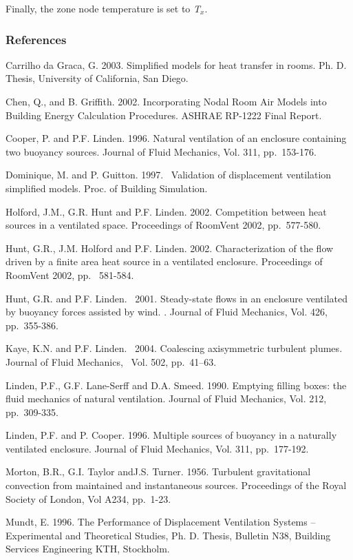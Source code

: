 Finally, the zone node temperature is set to \emph{T\(_{x}\)}.

\subsubsection{References}\label{references-2-000}

Carrilho da Graca, G. 2003. Simplified models for heat transfer in rooms. Ph. D. Thesis, University of California, San Diego.

Chen, Q., and B. Griffith. 2002. Incorporating Nodal Room Air Models into Building Energy Calculation Procedures. ASHRAE RP-1222 Final Report.

Cooper, P. and P.F. Linden. 1996. Natural ventilation of an enclosure containing two buoyancy sources. Journal of Fluid Mechanics, Vol. 311, pp.~153-176.

Dominique, M. and P. Guitton. 1997.~ Validation of displacement ventilation simplified models. Proc. of Building Simulation.

Holford, J.M., G.R. Hunt and P.F. Linden. 2002. Competition between heat sources in a ventilated space. Proceedings of RoomVent 2002, pp.~577-580.

Hunt, G.R., J.M. Holford and P.F. Linden. 2002. Characterization of the flow driven by a finite area heat source in a ventilated enclosure. Proceedings of RoomVent 2002, pp.~ 581-584.

Hunt, G.R. and P.F. Linden.~ 2001. Steady-state flows in an enclosure ventilated by buoyancy forces assisted by wind. . Journal of Fluid Mechanics, Vol. 426,~ pp.~355-386.

Kaye, K.N. and P.F. Linden.~ 2004. Coalescing axisymmetric turbulent plumes\emph{.} Journal of Fluid Mechanics, ~Vol. 502, pp.~41--63.

Linden, P.F., G.F. Lane-Serff and D.A. Smeed. 1990. Emptying filling boxes: the fluid mechanics of natural ventilation. Journal of Fluid Mechanics, Vol. 212, pp.~309-335.

Linden, P.F. and P. Cooper. 1996. Multiple sources of buoyancy in a naturally ventilated enclosure. Journal of Fluid Mechanics, Vol. 311, pp.~177-192.

Morton, B.R., G.I. Taylor andJ.S. Turner. 1956. Turbulent gravitational convection from maintained and instantaneous sources. Proceedings of the Royal Society of London, Vol A234, pp.~1-23.

Mundt, E. 1996. The Performance of Displacement Ventilation Systems -- Experimental and Theoretical Studies, Ph. D. Thesis, Bulletin N38, Building Services Engineering KTH, Stockholm.

